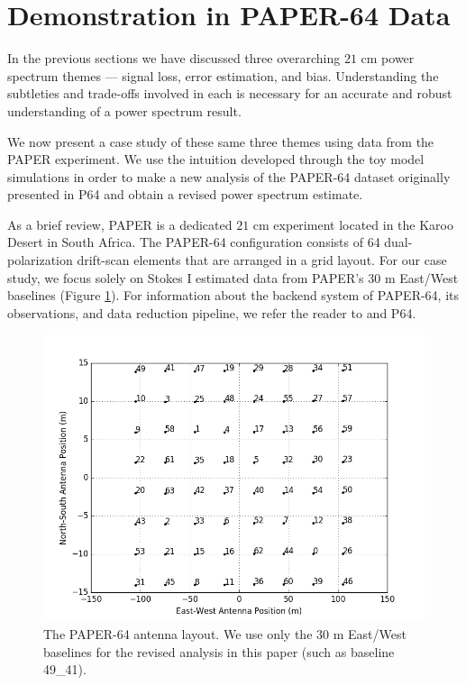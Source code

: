 \documentclass[preprint2,numberedappendix,tighten]{aastex6}  %
\begin{document}

\section{Demonstration in PAPER-64 Data}
\label{sec:CaseStudy}

In the previous sections we have discussed three overarching $21$ cm power spectrum themes --- signal loss, error estimation, 
and bias. Understanding the subtleties and trade-offs involved in each is necessary for an accurate and robust understanding of 
a power spectrum result. 

We now present a case study of these same three themes using data from the PAPER experiment. We use the intuition 
developed through the toy model simulations in order to make a new analysis of the PAPER-64 dataset originally presented in 
P64 and obtain a revised power spectrum estimate.

As a brief review, PAPER is a dedicated $21$ cm experiment located in the Karoo Desert in South Africa. The PAPER-64 
configuration consists of 64 dual-polarization drift-scan elements that are arranged in a grid layout. For our case study, we 
focus solely on Stokes I estimated data \citep{moore_et_al2013} from PAPER's $30$ m East/West baselines (Figure 
\ref{fig:ant_layout}). For information about the backend system of PAPER-64, its observations, and data reduction pipeline, we 
refer the reader to \citet{parsons_et_al2010} and P64.

\begin{figure}
	\centering
	\includegraphics[width=\columnwidth]{plots/ant_layout.png}
	\caption{The PAPER-64 antenna layout. We use only the $30$ m East/West baselines for the revised analysis in this 
paper (such as baseline 49\_41).}
	\label{fig:ant_layout}
\end{figure}
\end{document}
